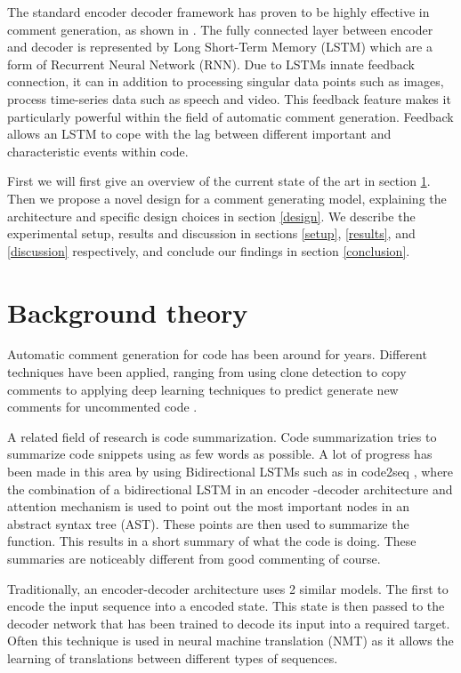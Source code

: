 \documentclass[a4paper,10pt]{article}
\theoremstyle{plain}
\theoremstyle{definition}
\begin{document}
\begin{multicols*}{2}
The standard encoder decoder framework has proven to be highly effective in comment generation, as shown in \cite{alon2018code2seq}. The fully connected layer between encoder and decoder is represented by Long Short-Term Memory (LSTM) which are a form of Recurrent Neural Network (RNN). Due to LSTMs innate feedback connection, it can in addition to processing singular data points such as images, process time-series data such as speech and video. This feedback feature makes it particularly powerful within the field of automatic comment generation. Feedback allows an LSTM to cope with the lag between different important and characteristic events within code.

First we will first give an overview of the current state of the art in section \ref{background}. Then we propose a novel design for a comment generating model, explaining the architecture and specific design choices in section \ref{design}. We describe the experimental setup, results and discussion in sections \ref{setup}, \ref{results}, and \ref{discussion} respectively, and conclude our findings in section \ref{conclusion}.

\section{Background theory}
\label{background}
Automatic comment generation for code has been around for years. Different techniques have been applied, ranging from using clone detection to copy comments \cite{clocom} to applying deep learning techniques to predict generate new comments for uncommented code \cite{hu2018deep}. 

A related field of research is code summarization. Code summarization tries to summarize code snippets using as few words as possible. A lot of progress has been made in this area by using Bidirectional LSTMs such as in code2seq \cite{alon2018code2seq}, where the combination of a bidirectional LSTM in an encoder -decoder architecture and attention mechanism is used to point out the most important nodes in an abstract syntax tree (AST). These points are then used to summarize the function. This results in a short summary of what the code is doing. These summaries are noticeably different from good commenting of course.

Traditionally, an encoder-decoder architecture uses 2 similar models. The first to encode the input sequence into a encoded state. This state is then passed to the decoder network that has been trained to decode its input into a required target. Often this technique is used in neural machine translation (NMT) as it allows the learning of translations between different types of sequences.


\end{multicols*}
\end{document}

